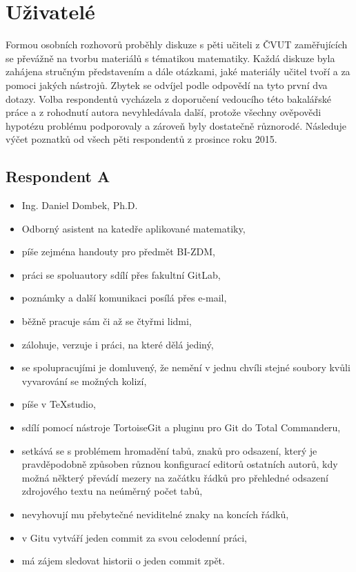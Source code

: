 \section{Uživatelé}

Formou osobních rozhovorů proběhly diskuze s pěti učiteli z ČVUT zaměřujících se převážně na tvorbu materiálů s tématikou matematiky. Každá diskuze byla zahájena stručným představením a dále otázkami, jaké materiály učitel tvoří a za pomoci jakých nástrojů. Zbytek se odvíjel podle odpovědí na tyto první dva dotazy. Volba respondentů vycházela z doporučení vedoucího této bakalářské práce a z rohodnutí autora nevyhledávala další, protože všechny ověpovědi hypotézu problému podporovaly a zároveň byly dostatečně různorodé. Následuje výčet poznatků od všech pěti respondentů z prosince roku 2015.

\subsection{Respondent A}

\begin{itemize}
	\item Ing. Daniel Dombek, Ph.D.
	\item Odborný asistent na katedře aplikované matematiky,
	\item píše zejména handouty pro předmět BI-ZDM,
	\item práci se spoluautory sdílí přes fakultní GitLab,
	\item poznámky a další komunikaci posílá přes e-mail,
	\item běžně pracuje sám či až se čtyřmi lidmi,
	\item zálohuje, verzuje i práci, na které dělá jediný,
	\item se spolupracujími je domluvený, že nemění v jednu chvíli stejné soubory kvůli vyvarování se možných kolizí,
	\item píše v TeXstudio,
	\item sdílí pomocí nástroje TortoiseGit a pluginu pro Git do Total Commanderu,
	\item setkává se s problémem hromadění tabů, znaků pro odsazení, který je pravděpodobně způsoben různou konfigurací editorů ostatních autorů, kdy možná některý převádí mezery na začátku řádků pro přehledné odsazení zdrojového textu na neúměrný počet tabů,
	\item nevyhovují mu přebytečné neviditelné znaky na koncích řádků,
	\item v Gitu vytváří jeden commit za svou celodenní práci,
	\item má zájem sledovat historii o jeden commit zpět.
\end{itemize}


